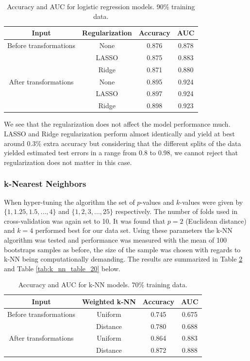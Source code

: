 \documentclass{article}
\begin{document}
\begin{table}[h!]
	\centering
	\begin{tabular}{cccc}
		Input & Regularization & Accuracy & AUC \\
		\midrule
		Before transformations & None & 0.876 & 0.878 \\
		& LASSO & 0.875 & 0.883 \\
		& Ridge & 0.871 & 0.880 \\
		\midrule
		After transformations & None & 0.895 & 0.924 \\
		& LASSO & 0.897 & 0.924 \\
		& Ridge & 0.898 & 0.923 \\
	\end{tabular}
	\caption{Accuracy and AUC for logistic regression models. 90\% training data.}
	\label{tab:logreg_table_90}
\end{table}

We see that the regularization does not affect the model performance much. LASSO and Ridge regularization perform almost identically and yield at best around 0.3\% extra accuracy but considering that the different splits of the data yielded estimated test errors in a range from 0.8 to 0.98, we cannot reject that regularization does not matter in this case.


\subsubsection{k-Nearest Neighbors}

When hyper-tuning the algorithm the set of $p$-values and $k$-values were given by $\{1,1.25,1.5,...,4\}$ and $\{1,2,3,...,25\}$ respectively. The number of folds used in cross-validation was again set to 10. It was found that $p = 2$ (Euclidean distance) and $k = 4$ performed best for our data set. Using these parameters the k-NN algorithm was tested and performance was measured with the mean of 100 bootstraps samples as before, the size of the sample was chosen with regards to k-NN being computationally demanding. The results are summarized in Table \ref{tab:k_nn_table_10} and Table \ref{tab:k_nn_table_20} below.
 

\begin{table}[!h]
\centering
\begin{tabular}{cccc}
		Input & Weighted k-NN & Accuracy & AUC \\
		\midrule
		Before transformations & Uniform & 0.745 & 0.675 \\
	    & Distance & 0.780 & 0.688 \\
		\midrule
		After transformations & Uniform & 0.864 & 0.883 \\
		& Distance & 0.872 & 0.888 \\
	\end{tabular}
	\caption{Accuracy and AUC for k-NN models. 70\% training data.}
	\label{tab:k_nn_table_10}
\end{table}
\end{document}
